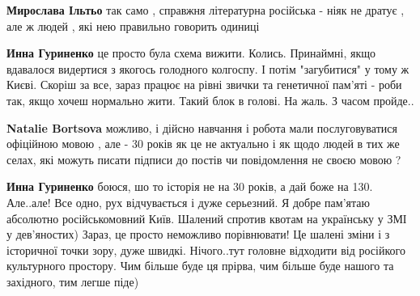 \begin{itemize}
\begin{itemize}
\textbf{Мирослава Ільтьо} так само , справжня літературна російська - ніяк не
дратує , але ж людей , які нею правильно говорить одиниці

 
\textbf{Инна Гуриненко} це просто була схема вижити. Колись. Принаймні, якщо
вдавалося видертися з якогось голодного колгоспу. І потім "загубитися" у тому ж
Києві. Скоріш за все, зараз працює на рівні звички та генетичної пам'яті - роби
так, якщо хочеш нормально жити. Такий блок в голові. На жаль. З часом пройде..

 
\textbf{Natalie Bortsova} можливо, і дійсно навчання і робота мали
послуговуватися офіційною мовою , але - 30 років як це не актуально і як щодо
людей в тих же селах, які можуть писати підписи до постів чи повідомлення не
своєю мовою ?

 
\textbf{Инна Гуриненко} боюся, шо то історія не на 30 років, а дай боже на 130.
Але..але! Все одно, рух відчувається і дуже серьезний. Я добре пам'ятаю
абсолютно російськомовний Київ. Шалений спротив квотам на українську у ЗМІ у
дев'яностих) Зараз, це просто неможливо порівнювати! Це шалені зміни і з
історичної точки зору, дуже швидкі. Нічого..тут головне відходити від російкого
культурного простору. Чим більше буде ця прірва, чим більше буде нашого та
західного, тим легше піде)

\end{itemize}

 

\end{itemize}
